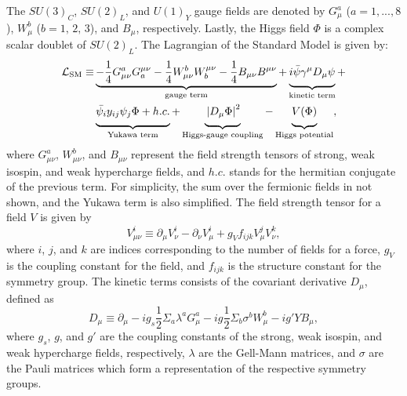 The $SU(3)_C$, $SU(2)_L$, and $U(1)_Y$ gauge fields are denoted by $G_\mu^a$ ($a=1,...,8$), $W_\mu^b$ ($b=1,\,2,\,3$), and $B_\mu$, respectively. Lastly, the Higgs field $\Phi$ is a complex scalar doublet of $SU(2)_L$. The Lagrangian of the Standard Model is given by:
\begin{equation}
\begin{split}    
    \mathcal{L}_{\mathrm{SM}}\equiv &
    \underbrace{-\frac{1}{4}G_{\mu\nu}^a G^{\mu\nu}_a-\frac{1}{4}W_{\mu\nu}^b W^{\mu\nu}_b-\frac{1}{4}B_{\mu\nu}B^{\mu\nu}}_\text{gauge term}+
    \underbrace{\vphantom{\frac{.}{.}}i \bar{\psi} \gamma^\mu D_\mu \psi}_\text{kinetic term}+ \\
    & \underbrace{\vphantom{\frac{.}{.}}\bar{\psi_i} y_{i j} \psi_j \Phi+h.c.}_\text{Yukawa term}+
    \underbrace{\vphantom{\frac{.}{.}}\left|D_\mu \Phi\right|^2}_\text{Higgs-gauge coupling}-
    \underbrace{\vphantom{\frac{.}{.}}V(\Phi)}_\text{Higgs potential}
    ,
\end{split}
\label{eqn:sm_lagrangiagn}
\end{equation}
where $G_{\mu\nu}^a$, $W_{\mu\nu}^b$, and $B_{\mu\nu}$ represent the field strength tensors of strong, weak isospin, and weak hypercharge fields, and $h.c.$ stands for the hermitian conjugate of the previous term. For simplicity, the sum over the fermionic fields in not shown, and the Yukawa term is also simplified. The field strength tensor for a field $V$ is given by
\begin{equation}
    V_{\mu\nu}^i \equiv \partial_\mu V_\nu^i - \partial_\nu V_\mu^i + g_V f_{ijk} V_\mu^jV_\nu^k,
\end{equation}
where $i$, $j$, and $k$ are indices corresponding to the number of fields for a force, $g_V$ is the coupling constant for the field, and $f_{ijk}$ is the structure constant for the symmetry group. The kinetic terms consists of the covariant derivative $D_\mu$, defined as
\begin{equation}
    D_\mu \equiv \partial_\mu - i g_s\frac{1}{2}\Sigma_a\lambda^a G_\mu^a -i g \frac{1}{2}\Sigma_b\sigma^b W_\mu^b -i g' Y B_\mu, 
\end{equation}
where $g_s$, $g$, and $g'$ are the coupling constants of the strong, weak isospin, and weak hypercharge fields, respectively, $\lambda$ are the Gell-Mann matrices, and $\sigma$ are the Pauli matrices which form a representation of the respective symmetry groups.

